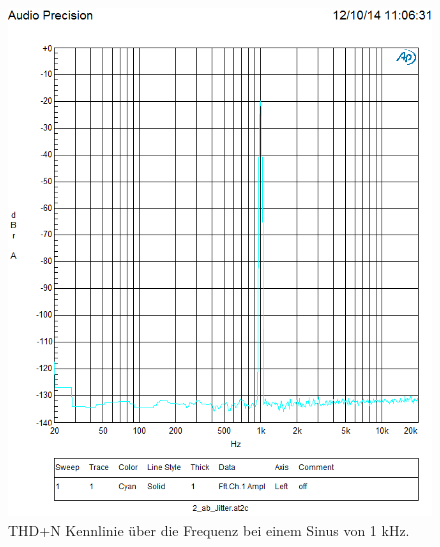 \begin{figure}[h!]
\centering
\includegraphics[width=\columnwidth]{figures/Aufg2/off_1khz.PNG} 
\caption{THD+N Kennlinie über die Frequenz bei einem Sinus von 1 kHz.}
\label{fig:1}
\end{figure}


